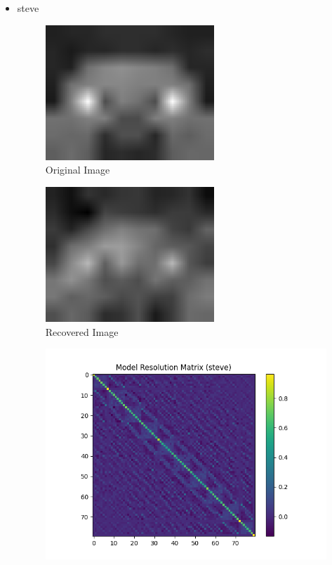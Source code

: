 \documentclass{article}
\begin{document}
\begin{itemize}
    \item steve
\begin{figure}[h]
    \centering
    \includegraphics[width=0.6\textwidth]{images/greyscale/steve.png}
    \caption{Original Image}
\end{figure}
\begin{figure}[h]
    \centering
    \includegraphics[width=0.6\textwidth]{images/outputs/steve.png}
    \caption{Recovered Image}
\end{figure}
\begin{figure}[h]
    \centering
    \includegraphics[width=1\textwidth]{images/outputs/modelres/steve.png}

\end{figure}
\end{itemize}
\end{document}
